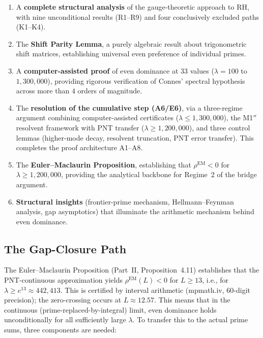 \documentclass[12pt,a4paper]{article}
\theoremstyle{definition}
\theoremstyle{remark}
\begin{document}
\begin{enumerate}
  \item A \textbf{complete structural analysis} of the gauge-theoretic approach to RH, with nine unconditional results (R1--R9) and four conclusively excluded paths (K1--K4).

  \item The \textbf{Shift Parity Lemma}, a purely algebraic result about trigonometric shift matrices, establishing universal even preference of individual primes.

  \item A \textbf{computer-assisted proof} of even dominance at $33$ values ($\lambda = 100$ to $1{,}300{,}000$), providing rigorous verification of Connes' spectral hypothesis across more than $4$ orders of magnitude.

  \item The \textbf{resolution of the cumulative step (A6/E6)}, via a three-regime argument combining computer-assisted certificates ($\lambda \leq 1{,}300{,}000$), the M1$''$ resolvent framework with PNT transfer ($\lambda \geq 1{,}200{,}000$), and three control lemmas (higher-mode decay, resolvent truncation, PNT error transfer). This completes the proof architecture A1--A8.

  \item The \textbf{Euler--Maclaurin Proposition}, establishing that $\rho^{\mathrm{EM}} < 0$ for $\lambda \geq 1{,}200{,}000$, providing the analytical backbone for Regime~2 of the bridge argument.

  \item \textbf{Structural insights} (frontier-prime mechanism, Hellmann--Feynman analysis, gap asymptotics) that illuminate the arithmetic mechanism behind even dominance.
\end{enumerate}

\subsection{The Gap-Closure Path}
\label{sec:gap-closure-path}

The Euler--Maclaurin Proposition (Part~II, Proposition~4.11) establishes that the PNT-continuous approximation yields $\rho^{\mathrm{EM}}(L) < 0$ for $L \geq 13$, i.e., for $\lambda \geq e^{13} \approx 442{,}413$. This is certified by interval arithmetic (mpmath.iv, 60-digit precision); the zero-crossing occurs at $L \approx 12.57$. This means that in the continuous (prime-replaced-by-integral) limit, even dominance holds unconditionally for all sufficiently large $\lambda$. To transfer this to the actual prime sums, three components are needed:
\end{document}
